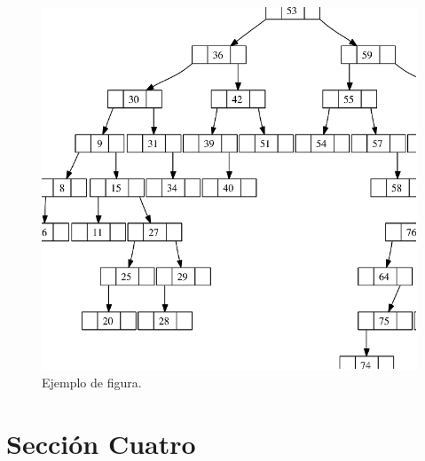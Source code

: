 \begin{figure}[htb]
   \centering
   \includegraphics[width=0.8\linewidth]{images/figura_1}
   \caption{Ejemplo de figura.}
   \label{fig:intro}
\end{figure}

\lipsum[4]

\section{Sección Cuatro}

\noindent \lipsum[5-6]